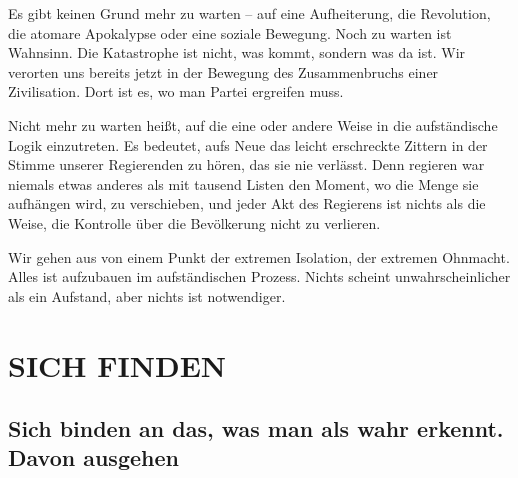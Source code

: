 Es gibt keinen Grund mehr zu warten – auf eine Aufheiterung, die
Revolution, die atomare Apokalypse oder eine soziale Bewegung. Noch
zu warten ist Wahnsinn. Die Katastrophe ist nicht, was kommt,
sondern was da ist. Wir verorten uns bereits jetzt in der Bewegung
des Zusammenbruchs einer Zivilisation. Dort ist es, wo man Partei
ergreifen muss.
\extrapar{}

Nicht mehr zu warten heißt, auf die eine oder andere Weise in die
aufständische Logik einzutreten. Es bedeutet, aufs Neue das leicht
erschreckte Zittern in der Stimme unserer Regierenden zu hören, das
sie nie verlässt. Denn regieren war niemals etwas anderes als mit
tausend Listen den Moment, wo die Menge sie aufhängen wird, zu
verschieben, und jeder Akt des Regierens ist nichts als die Weise,
die Kontrolle über die Bevölkerung nicht zu verlieren.
\extrapar{}

Wir gehen aus von einem Punkt der extremen Isolation, der extremen
Ohnmacht. Alles ist aufzubauen im aufständischen Prozess. Nichts
scheint unwahrscheinlicher als ein Aufstand, aber nichts ist
notwendiger.

\section{SICH FINDEN}

\subsection{Sich binden an das, was man als wahr erkennt.\\
Davon ausgehen}

